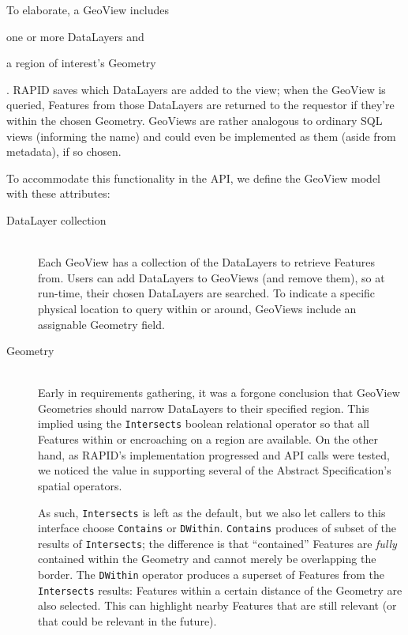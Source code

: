 To elaborate, a GeoView includes 
\begin{enumerate*}[label=\itshape\alph*\upshape)]
\item one or more DataLayers and
\item a region of interest's Geometry
\end{enumerate*}. RAPID saves which DataLayers are added to the view; when the GeoView is queried, Features from those DataLayers are returned to the requestor if they're within the chosen Geometry. GeoViews are rather analogous to ordinary SQL views (informing the name) and could even be implemented as them (aside from metadata), if so chosen.

To accommodate this functionality in the API, we define the GeoView model with these attributes:

\begin{description}

\item[DataLayer collection] \hfill \\
Each GeoView has a collection of the DataLayers to retrieve Features from. Users can add DataLayers to GeoViews (and remove them), so at run-time, their chosen DataLayers are searched. To indicate a specific physical location to query within or around, GeoViews include an assignable Geometry field.

\item[Geometry] \hfill \\
Early in requirements gathering, it was a forgone conclusion that GeoView Geometries should narrow DataLayers to their specified region. This implied using the \texttt{Intersects} boolean relational operator so that all Features within or encroaching on a region are available. On the other hand, as RAPID's implementation progressed and API calls were tested, we noticed the value in supporting several of the Abstract Specification's spatial operators.

As such, \texttt{Intersects} is left as the default, but we also let callers to this interface choose \texttt{Contains} or \texttt{DWithin}. \texttt{Contains} produces of subset of the results of \texttt{Intersects}; the difference is that ``contained'' Features are \textit{fully} contained within the Geometry and cannot merely be overlapping the border. The \texttt{DWithin} operator produces a superset of Features from the \texttt{Intersects} results: Features within a certain distance of the Geometry are also selected. This can highlight nearby Features that are still relevant (or that could be relevant in the future).


\end{description}
